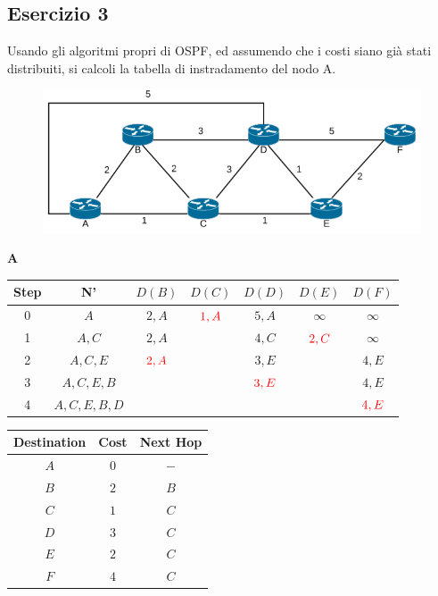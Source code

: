 \documentclass[10pt]{article}
\begin{document}
	\subsection{Esercizio 3}
	Usando gli algoritmi propri di OSPF, ed assumendo che i costi siano già stati distribuiti, si calcoli la tabella di instradamento del nodo A.
	\begin{figure}[h]
	\centering
	\includegraphics[width=13cm]{es3}
	\end{figure}
	\begin{center}
	\textbf{A}
 		\begin{tabular}{||c c c c c c c||} 
 			\hline
 			Step & N' & $D(B)$ & $D(C)$ & $D(D)$ & $D(E)$ & $D(F)$ \\[0.5ex] 
 			\hline\hline
 			0 & $A$ & $2,A$ & $\color{red} 1,A$ & $5,A$ & $\infty$ & $\infty$ \\
 			\hline
 			1 & $A,C$ & $2,A$ & & $4,C$ & $\color{red} 2,C$ & $\infty$ \\
 			\hline
 			2 & $A,C,E$ & $\color{red} 2,A$ & & $3,E$ & & $4,E$ \\
 			\hline
 			3 & $A,C,E,B$ & & & $\color{red} 3,E$ & & $4,E$ \\
 			\hline
 			4 & $A,C,E,B,D$ & & & & & $\color{red} 4,E$ \\[0.5ex] 
 			\hline
		\end{tabular}
		\quad
		\begin{tabular}{||c || c || c||}
			\hline
 			Destination & Cost & Next Hop\\[0.5ex] 
 			\hline\hline
			$A$ & $0$ & $-$\\
			$B$ & $2$ & $B$\\
 			$C$ & $1$ & $C$\\
			$D$ & $3$ & $C$\\
			$E$ & $2$ & $C$\\
			$F$ & $4$ & $C$\\[0.5ex] 
			\hline
		\end{tabular}
	\end{center}
	
\end{document}
